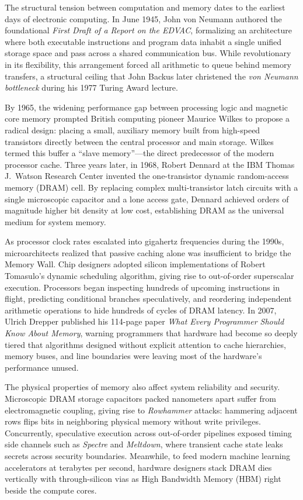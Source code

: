 \begin{historybox}
The structural tension between computation and memory dates to the earliest days of electronic computing. In June 1945, John von Neumann authored the foundational \emph{First Draft of a Report on the EDVAC}, formalizing an architecture where both executable instructions and program data inhabit a single unified storage space and pass across a shared communication bus. While revolutionary in its flexibility, this arrangement forced all arithmetic to queue behind memory transfers, a structural ceiling that John Backus later christened the \emph{von Neumann bottleneck} during his 1977 Turing Award lecture.

By 1965, the widening performance gap between processing logic and magnetic core memory prompted British computing pioneer Maurice Wilkes to propose a radical design: placing a small, auxiliary memory built from high-speed transistors directly between the central processor and main storage. Wilkes termed this buffer a ``slave memory''---the direct predecessor of the modern processor cache. Three years later, in 1968, Robert Dennard at the IBM Thomas J.~Watson Research Center invented the one-transistor dynamic random-access memory (DRAM) cell. By replacing complex multi-transistor latch circuits with a single microscopic capacitor and a lone access gate, Dennard achieved orders of magnitude higher bit density at low cost, establishing DRAM as the universal medium for system memory.

As processor clock rates escalated into gigahertz frequencies during the 1990s, microarchitects realized that passive caching alone was insufficient to bridge the Memory Wall. Chip designers adopted silicon implementations of Robert Tomasulo's dynamic scheduling algorithm, giving rise to out-of-order superscalar execution. Processors began inspecting hundreds of upcoming instructions in flight, predicting conditional branches speculatively, and reordering independent arithmetic operations to hide hundreds of cycles of DRAM latency. In 2007, Ulrich Drepper published his 114-page paper \emph{What Every Programmer Should Know About Memory}, warning programmers that hardware had become so deeply tiered that algorithms designed without explicit attention to cache hierarchies, memory buses, and line boundaries were leaving most of the hardware's performance unused.

The physical properties of memory also affect system reliability and security. Microscopic DRAM storage capacitors packed nanometers apart suffer from electromagnetic coupling, giving rise to \emph{Rowhammer} attacks: hammering adjacent rows flips bits in neighboring physical memory without write privileges. Concurrently, speculative execution across out-of-order pipelines exposed timing side channels such as \emph{Spectre} and \emph{Meltdown}, where transient cache state leaks secrets across security boundaries. Meanwhile, to feed modern machine learning accelerators at terabytes per second, hardware designers stack DRAM dies vertically with through-silicon vias as High Bandwidth Memory (HBM) right beside the compute cores.
\end{historybox}

